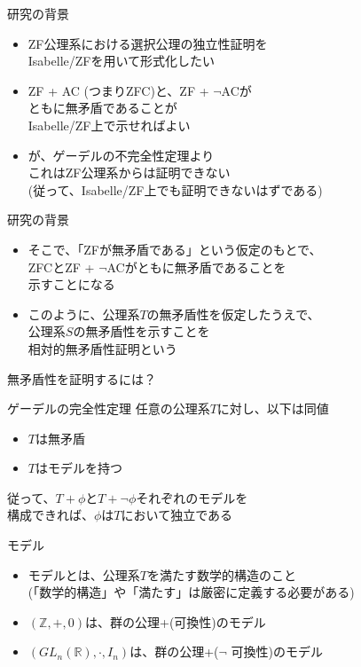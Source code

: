 \documentclass[17pt,aspectratio=169]{beamer}
\begin{document}
\begin{frame} {研究の背景}
    \begin{itemize}
        \item ZF公理系における選択公理の独立性証明を\\Isabelle/ZFを用いて形式化したい
        \item ZF + AC (つまりZFC)と、ZF + $\neg$ACが\\ ともに無矛盾であることが\\Isabelle/ZF上で示せればよい
        \item が、ゲーデルの不完全性定理より\\これはZF公理系からは証明できない\\{\small (従って、Isabelle/ZF上でも証明できないはずである)}
    \end{itemize}
\end{frame}

\begin{frame} {研究の背景}
    \begin{itemize}
        \item そこで、「ZFが無矛盾である」という仮定のもとで、\\ZFCとZF + $\neg$ACがともに無矛盾であることを\\示すことになる
        \item このように、公理系$T$の無矛盾性を仮定したうえで、\\公理系$S$の無矛盾性を示すことを\\相対的無矛盾性証明という
    \end{itemize}
\end{frame}

\begin{frame} {無矛盾性を証明するには？}
    \begin{exampleblock}{ゲーデルの完全性定理}
        任意の公理系$T$に対し、以下は同値
        \begin{itemize}
            \item $T$は無矛盾
            \item $T$はモデルを持つ
        \end{itemize}
    \end{exampleblock}
    従って、$T + \phi$と$T + \neg \phi$それぞれのモデルを\\構成できれば、$\phi$は$T$において独立である
\end{frame}

\begin{frame} {モデル}
    \begin{itemize}
        \item モデルとは、公理系$T$を満たす数学的構造のこと \\ {\footnotesize (「数学的構造」や「満たす」は厳密に定義する必要がある)}
        \item $(\mathbb{Z}, +, 0)$は、群の公理+(可換性)のモデル
        \item $(GL_n(\mathbb{R}), \cdot, I_n)$は、群の公理+($\neg$ 可換性)のモデル
    \end{itemize}
\end{frame}
\end{document}
